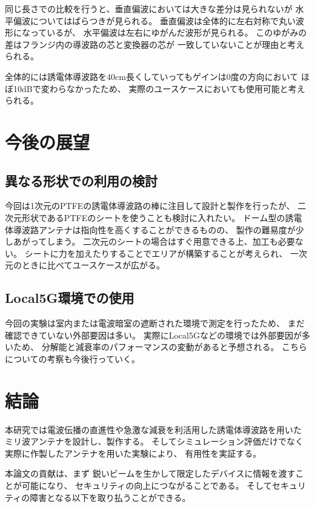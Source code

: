 \documentclass[technicalreport]{ieicej}
\begin{document}
同じ長さでの比較を行うと、垂直偏波においては大きな差分は見られないが
水平偏波についてはばらつきが見られる。
垂直偏波は全体的に左右対称で丸い波形になっているが、
水平偏波は左右にゆがんだ波形が見られる。
このゆがみの差はフランジ内の導波路の芯と変換器の芯が
一致していないことが理由と考えられる。

全体的には誘電体導波路を40cm長くしていってもゲインは0度の方向において
ほぼ10dBで変わらなかったため、
実際のユースケースにおいても使用可能と考えられる。


\section{今後の展望}

\subsection{異なる形状での利用の検討}

今回は1次元のPTFEの誘電体導波路の棒に注目して設計と製作を行ったが、
二次元形状であるPTFEのシートを使うことも検討に入れたい。
ドーム型の誘電体導波路アンテナは指向性を高くすることができるものの、
製作の難易度が少しあがってしまう。
二次元のシートの場合はすぐ用意できる上、加工も必要ない。
シートに力を加えたりすることでエリアが構築することが考えられ、
一次元のときに比べてユースケースが広がる。

\subsection{Local5G環境での使用}

今回の実験は室内または電波暗室の遮断された環境で測定を行ったため、
まだ確認できていない外部要因は多い。
実際にLocal5Gなどの環境では外部要因が多いため、
分解能と減衰率のパフォーマンスの変動があると予想される。
こちらについての考察も今後行っていく。

\section{結論}

本研究では電波伝播の直進性や急激な減衰を利活用した誘電体導波路を用いた
ミリ波アンテナを設計し、製作する。
そしてシミュレーション評価だけでなく実際に作製したアンテナを用いた実験により、
有用性を実証する。

本論文の貢献は、まず
鋭いビームを生かして限定したデバイスに情報を渡すことが可能になり、
セキュリティの向上につながることである。
そしてセキュリティの障害となる以下を取り払うことができる。
\end{document}
